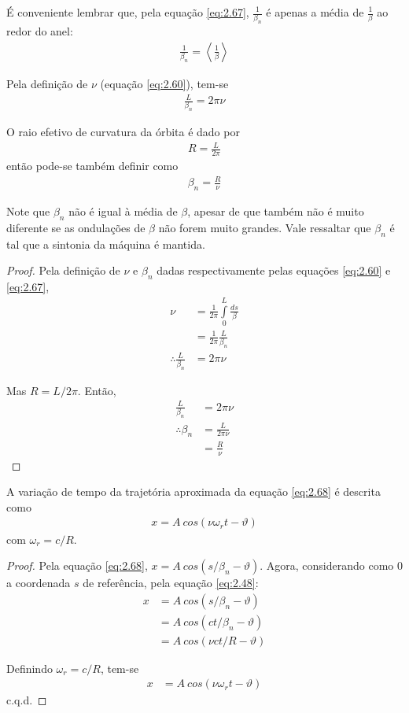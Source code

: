 É conveniente lembrar que, pela equação \eqref{eq:2.67}, $\frac{1}{\beta_n}$ é apenas a média de $\frac{1}{\beta}$ ao redor do anel:
\begin{align}
	\frac{1}{\beta_n} = \left \langle \frac{1}{\beta} \right \rangle
\end{align}

Pela definição de $\nu$ (equação \eqref{eq:2.60}), tem-se
\begin{align}
	\frac{L}{\beta_n} = 2\pi \nu
\end{align}

O raio efetivo de curvatura da órbita é dado por
\begin{align}
	R = \frac{L}{2\pi}
\end{align}
então pode-se também definir como
\begin{align}
	\beta_n = \frac{R}{\nu}\label{eq:2.72}
\end{align}

Note que $\beta_n$ não é igual à média de $\beta$, apesar de que também não é muito diferente se as ondulações de $\beta$ não forem muito grandes. Vale ressaltar que $\beta_n$ é tal que a sintonia da máquina é mantida.

\begin{proof}
	Pela definição de $\nu$ e $\beta_n$ dadas respectivamente pelas equações \eqref{eq:2.60} e \eqref{eq:2.67},
	\begin{align*}
		\nu &= \frac{1}{2\pi} \int\limits_{0}^{L}\frac{ds}{\beta}\\
			&= \frac{1}{2\pi} \frac{L}{\beta_n}\\
		\therefore \frac{L}{\beta_n} &= 2\pi \nu
	\end{align*}
	
	Mas $R = L/2\pi$. Então,
	\begin{align*}
		\frac{L}{\beta_n} &= 2\pi \nu\\
		\therefore \beta_n &= \frac{L}{2\pi \nu}\\
						   &= \frac{R}{\nu}
	\end{align*}
\end{proof}

A variação de tempo da trajetória aproximada da equação \eqref{eq:2.68} é descrita como
\begin{align}
	x = A\ cos(\nu \omega_r t - \vartheta)
\end{align}
com $\omega_r = c/R$.

\begin{proof}
	Pela equação \eqref{eq:2.68}, $x = A\ cos(s/\beta_n - \vartheta)$. Agora, considerando como 0 a coordenada $s$ de referência, pela equação \eqref{eq:2.48}:
	\begin{align*}
		x &= A\ cos(s/\beta_n - \vartheta)\\
		  &= A\ cos(ct/\beta_n - \vartheta)\\
		  &= A\ cos(\nu c t/R - \vartheta)
	\end{align*}
	
	Definindo $\omega_r = c/R$, tem-se
	\begin{align*}
		x &= A\ cos(\nu \omega_r t - \vartheta)
	\end{align*}
	c.q.d.
\end{proof}

